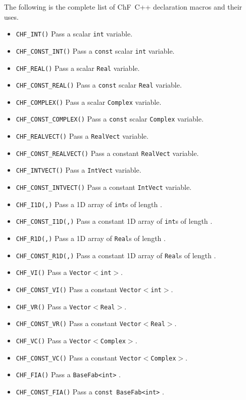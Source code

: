The following is the complete list of ChF\ C++ declaration macros and their uses.
\begin{itemize}
\item {\tt CHF\_INT(\argv)} Pass a scalar {\tt int} variable.
\item {\tt CHF\_CONST\_INT(\argv)} Pass a {\tt const} scalar {\tt int} variable.
\item {\tt CHF\_REAL(\argv)} Pass a scalar {\tt Real} variable.
\item {\tt CHF\_CONST\_REAL(\argv)} Pass a {\tt const} scalar {\tt Real} variable.
\item {\tt CHF\_COMPLEX(\argv)} Pass a scalar {\tt Complex} variable.
\item {\tt CHF\_CONST\_COMPLEX(\argv)} Pass a {\tt const} scalar {\tt Complex} variable.
\item {\tt CHF\_REALVECT(\argv)} Pass a {\tt RealVect} variable. 
\item {\tt CHF\_CONST\_REALVECT(\argv)} Pass a constant {\tt RealVect} variable. 
\item {\tt CHF\_INTVECT(\argv)} Pass a {\tt IntVect} variable.
\item {\tt CHF\_CONST\_INTVECT(\argv)} Pass a constant {\tt IntVect} variable.
\item {\tt CHF\_I1D(\argv,\lenv)} Pass a 1D array of {\tt int}s of length \lenv.
\item {\tt CHF\_CONST\_I1D(\argv,\lenv)} Pass a constant 1D array of {\tt int}s of length \lenv.
\item {\tt CHF\_R1D(\argv,\lenv)} Pass a 1D array of {\tt Real}s of length \lenv.
\item {\tt CHF\_CONST\_R1D(\argv,\lenv)} Pass a constant 1D array of {\tt Real}s of length \lenv.
\item {\tt CHF\_VI(\argv)} Pass a {\tt Vector$<$int$>$}.
\item {\tt CHF\_CONST\_VI(\argv)} Pass a constant {\tt Vector$<$int$>$}.
\item {\tt CHF\_VR(\argv)} Pass a {\tt Vector$<$Real$>$}.
\item {\tt CHF\_CONST\_VR(\argv)} Pass a constant {\tt Vector$<$Real$>$}.
\item {\tt CHF\_VC(\argv)} Pass a {\tt Vector$<$Complex$>$}.
\item {\tt CHF\_CONST\_VC(\argv)} Pass a constant {\tt Vector$<$Complex$>$}.
\item {\tt CHF\_FIA(\argv)} Pass a {\verb/BaseFab<int>/} .
\item {\tt CHF\_CONST\_FIA(\argv)} Pass a {\verb/const BaseFab<int>/} .

\end{itemize}
